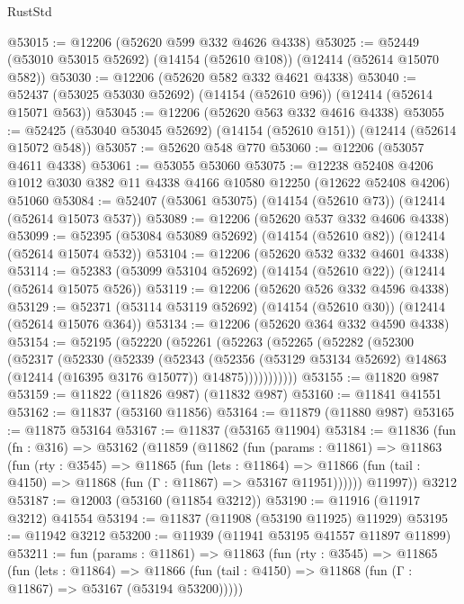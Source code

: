 \begin{lexlean}{RustStd}
\begin{coremodule}
@53015 := @12206 (@52620 @599 @332 @4626 @4338)
@53025 := @52449 (@53010 @53015 @52692) (@14154 (@52610 @108)) (@12414 (@52614 @15070 @582))
@53030 := @12206 (@52620 @582 @332 @4621 @4338)
@53040 := @52437 (@53025 @53030 @52692) (@14154 (@52610 @96)) (@12414 (@52614 @15071 @563))
@53045 := @12206 (@52620 @563 @332 @4616 @4338)
@53055 := @52425 (@53040 @53045 @52692) (@14154 (@52610 @151)) (@12414 (@52614 @15072 @548))
@53057 := @52620 @548 @770
@53060 := @12206 (@53057 @4611 @4338)
@53061 := @53055 @53060
@53075 := @12238
    @52408
    @4206
    @1012
    @3030
    @382
    @11
    @4338
    @4166
    @10580
    @12250
    (@12622 @52408 @4206)
    @51060
@53084 := @52407 (@53061 @53075) (@14154 (@52610 @73)) (@12414 (@52614 @15073 @537))
@53089 := @12206 (@52620 @537 @332 @4606 @4338)
@53099 := @52395 (@53084 @53089 @52692) (@14154 (@52610 @82)) (@12414 (@52614 @15074 @532))
@53104 := @12206 (@52620 @532 @332 @4601 @4338)
@53114 := @52383 (@53099 @53104 @52692) (@14154 (@52610 @22)) (@12414 (@52614 @15075 @526))
@53119 := @12206 (@52620 @526 @332 @4596 @4338)
@53129 := @52371 (@53114 @53119 @52692) (@14154 (@52610 @30)) (@12414 (@52614 @15076 @364))
@53134 := @12206 (@52620 @364 @332 @4590 @4338)
@53154 := @52195
    (@52220
      (@52261
        (@52263
          (@52265
            (@52282
              (@52300
                (@52317
                  (@52330
                    (@52339
                      (@52343
                        (@52356
                          (@53129 @53134 @52692)
                          @14863
                          (@12414 (@16395 @3176 @15077))
                          @14875)))))))))))
@53155 := @11820 @987
@53159 := @11822 (@11826 @987) (@11832 @987)
@53160 := @11841 @41551
@53162 := @11837 (@53160 @11856)
@53164 := @11879 (@11880 @987)
@53165 := @11875 @53164
@53167 := @11837 (@53165 @11904)
@53184 := @11836
    (fun (fn : @316) =>
    @53162
      (@11859
        (@11862
          (fun (params : @11861) =>
          @11863
            (fun (rty : @3545) =>
            @11865
              (fun (lets : @11864) =>
              @11866 (fun (tail : @4150) => @11868 (fun (Γ : @11867) => @53167 @11951))))))
        @11997))
    @3212
@53187 := @12003 (@53160 (@11854 @3212))
@53190 := @11916 (@11917 @3212) @41554
@53194 := @11837 (@11908 (@53190 @11925) @11929)
@53195 := @11942 @3212
@53200 := @11939 (@11941 @53195 @41557 @11897 @11899)
@53211 := fun (params : @11861) =>
  @11863
    (fun (rty : @3545) =>
    @11865
      (fun (lets : @11864) =>
      @11866 (fun (tail : @4150) => @11868 (fun (Γ : @11867) => @53167 (@53194 @53200)))))

\end{coremodule}
\end{lexlean}
